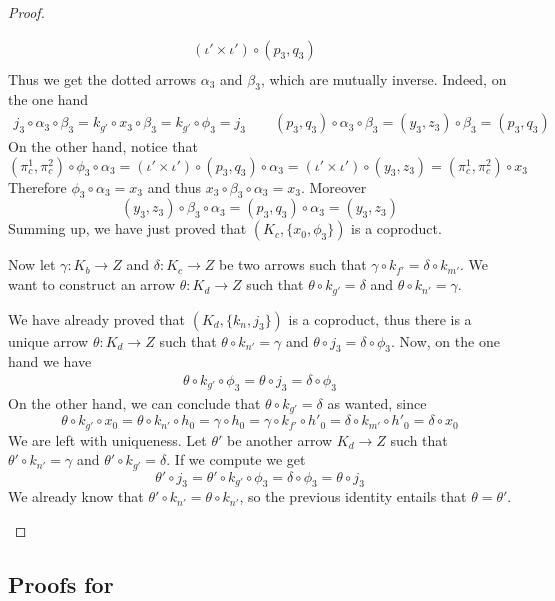 \documentclass[3p]{elsarticle}
\theoremstyle{remark}
\theoremstyle{definition}
\begin{document}
\begin{proof}
\begin{enumerate}
\[\begin{split}
(\iota'\times \iota')\circ (p_3, q_3)\\& \end{split}\] 
Thus we get the dotted arrows $\alpha_3$ and $\beta_3$, which are mutually inverse. Indeed, on the one hand
\begin{align*}
j_3\circ \alpha_3\circ \beta_3=k_{g'}\circ x_3\circ \beta_3=k_{g'} \circ \phi_3=j_3  \qquad 
(p_3, q_3)\circ \alpha_3\circ \beta_3=(y_3, z_3)\circ \beta_3=(p_3, q_3) 
\end{align*}
 On the other hand, notice that
 \[(\pi^1_c, \pi^2_c)\circ \phi_3\circ \alpha_3 =(\iota'\times \iota')\circ (p_3, q_3)\circ \alpha_3= (\iota'\times \iota')\circ (y_3, z_3)=(\pi^1_c, \pi^2_c)\circ x_3\]
 Therefore $\phi_3\circ \alpha_3=x_3$ and thus $x_3\circ \beta_3\circ \alpha_3=x_3$. Moreover
 \[(y_3, z_3)\circ \beta_3\circ \alpha_3=(p_3, q_3)\circ \alpha_3=(y_3, z_3)\]
 Summing up, we have just proved that $(K_c, \{x_0, \phi_3\})$ is a coproduct.
 
 Now let $\gamma\colon K_b\to Z$ and $\delta\colon K_c\to Z$ be two arrows such that $\gamma\circ k_{f'}=\delta\circ k_{m'}$. We want to construct an arrow $\theta\colon K_d\to Z$ such that $\theta\circ k_{g'}=\delta$ and $\theta\circ k_{n'}=\gamma$.	
 
 We have already proved that $(K_d, \{k_n, j_3\})$ is a coproduct, thus there is a unique arrow $\theta\colon K_d\to Z$ such that  $\theta \circ k_{n'}=\gamma$ and $\theta \circ j_3=\delta \circ \phi_3 $.
 Now, on the one hand we have
 \begin{align*}
 	\theta \circ k_{g'}\circ \phi_3=\theta \circ  j_3=\delta\circ \phi_3 
 \end{align*}
 On the other hand, we can conclude that $\theta \circ k_{g'}=\delta$ as wanted, since
 \[\theta \circ k_{g'}\circ x_0=\theta \circ k_{n'}\circ h_0=\gamma \circ h_0=\gamma \circ k_{f'}\circ h'_0=\delta \circ k_{m'}\circ h'_0=\delta \circ x_0 \]
 We are left with uniqueness. Let $\theta'$ be another arrow $K_d\to Z$ such that $\theta'\circ k_{n'}=\gamma$ and $\theta'\circ k_{g'}= \delta$. If we compute we get
 \[\theta'\circ j_3=\theta'\circ k_{g'}\circ \phi_3=\delta \circ \phi_3=\theta \circ j_3 \]
 We already know that $\theta'\circ k_{n'}=\theta \circ k_{n'}$, so the previous identity entails that $\theta =\theta'$.
			 \qedhere 
	\end{enumerate}
\end{proof}

\subsection{Proofs for }
\end{document}
